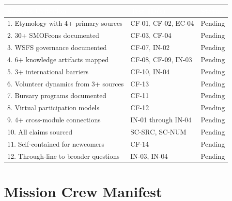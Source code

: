 \documentclass[11pt,letterpaper]{article}
\newcommand{\tableheader}[1]{\textbf{\sffamily\textcolor{white}{#1}}}
\begin{document}
\begin{center}
\begin{tabularx}{\textwidth}{XL{3cm}C{1.5cm}}
\toprule
{}
\tableheader{Success Criterion} & \tableheader{Test ID(s)} & \tableheader{Status} \\
. Etymology with 4+ primary sources & CF-01, CF-02, EC-04 & Pending \\
2. 30+ SMOFcons documented & CF-03, CF-04 & Pending \\
3. WSFS governance documented & CF-07, IN-02 & Pending \\
4. 6+ knowledge artifacts mapped & CF-08, CF-09, IN-03 & Pending \\
5. 3+ international barriers & CF-10, IN-04 & Pending \\
6. Volunteer dynamics from 3+ sources & CF-13 & Pending \\
7. Bursary programs documented & CF-11 & Pending \\
8. Virtual participation models & CF-12 & Pending \\
9. 4+ cross-module connections & IN-01 through IN-04 & Pending \\
10. All claims sourced & SC-SRC, SC-NUM & Pending \\
11. Self-contained for newcomers & CF-14 & Pending \\
12. Through-line to broader questions & IN-03, IN-04 & Pending \\
\bottomrule
\end{tabularx}
\end{center}

\section{Mission Crew Manifest}
\end{document}
